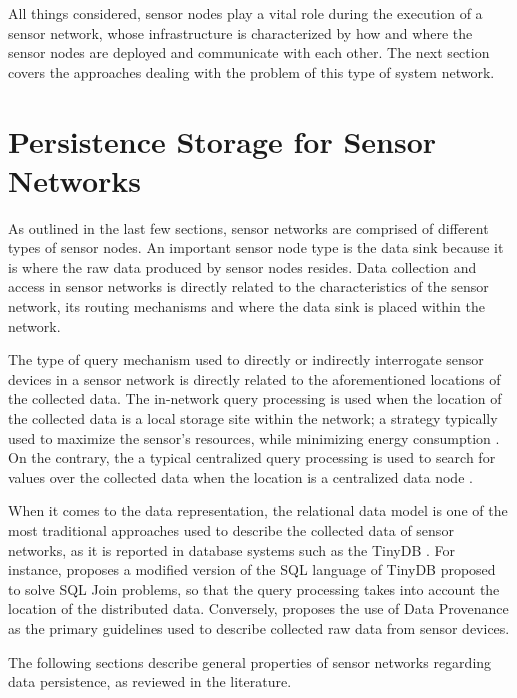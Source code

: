 All things considered, sensor nodes play a vital role during the execution
of a sensor network, whose infrastructure is characterized by how and where the
sensor nodes are deployed and communicate with each other. The next
section covers the approaches dealing with the problem of this type of system
network.

\section{Persistence Storage for Sensor Networks}
\label{sec:sn-persitence-storage}

As outlined in the last few sections, sensor networks are comprised of
different types of sensor nodes. An important sensor node type is the
data sink because it is where the raw data produced by sensor
nodes resides. Data collection and access in sensor networks is directly
related to the characteristics of the sensor network, its routing mechanisms
and where the data sink is placed within the network.

The type of query mechanism used to directly or indirectly interrogate sensor
devices in a sensor network is directly related to the aforementioned locations
of the collected data. The in-network query processing is used when the
location of the collected data is a local storage site \cite{sn-storage01,
sn-storage03} within the network; a strategy typically used to maximize the
sensor's resources, while minimizing energy consumption \cite{sn-storage04}. On
the contrary, the a typical centralized query processing is used to search for
values over the collected data when the location is a centralized data
node \cite{sn-storage02}.

When it comes to the data representation, the relational data model
\cite{relational-model} is one of the most traditional approaches used to
describe the collected data of sensor networks, as it is reported in database
systems such as the TinyDB \cite{sn-db-tinydb}. For instance, \cite{sn-db-newop}
proposes a modified version of the SQL language of TinyDB proposed to solve
SQL Join problems, so that the query processing takes into account the location
of the distributed data. Conversely, \cite{sn-provenance} proposes the use of
Data Provenance as the primary guidelines used to describe collected  raw data from
sensor devices.

The following sections describe general properties of sensor networks regarding
data persistence, as reviewed in the literature.

